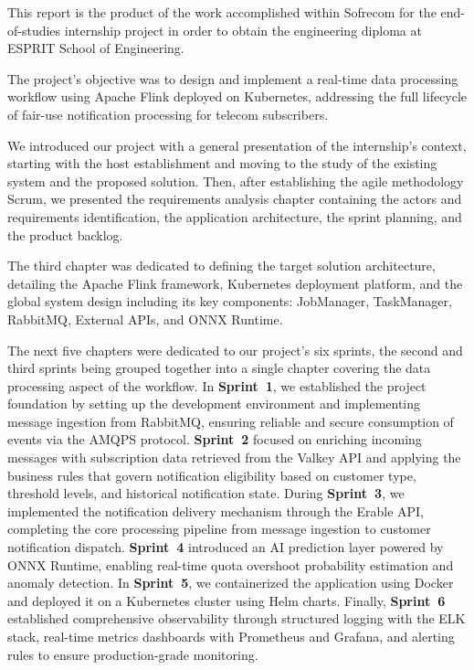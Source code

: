 
This report is the product of the work accomplished within Sofrecom for the end-of-studies internship project in order to obtain the engineering diploma at ESPRIT School of Engineering.

The project's objective was to design and implement a real-time data processing workflow using Apache Flink deployed on Kubernetes, addressing the full lifecycle of fair-use notification processing for telecom subscribers.

We introduced our project with a general presentation of the internship's context, starting with the host establishment and moving to the study of the existing system and the proposed solution. Then, after establishing the agile methodology Scrum, we presented the requirements analysis chapter containing the actors and requirements identification, the application architecture, the sprint planning, and the product backlog.

The third chapter was dedicated to defining the target solution architecture, detailing the Apache Flink framework, Kubernetes deployment platform, and the global system design including its key components: JobManager, TaskManager, RabbitMQ, External APIs, and ONNX Runtime.

The next five chapters were dedicated to our project's six sprints, the second and third sprints being grouped together into a single chapter covering the data processing aspect of the workflow. In \textbf{Sprint~1}, we established the project foundation by setting up the development environment and implementing message ingestion from RabbitMQ, ensuring reliable and secure consumption of events via the AMQPS protocol. \textbf{Sprint~2} focused on enriching incoming messages with subscription data retrieved from the Valkey API and applying the business rules that govern notification eligibility based on customer type, threshold levels, and historical notification state. During \textbf{Sprint~3}, we implemented the notification delivery mechanism through the Erable API, completing the core processing pipeline from message ingestion to customer notification dispatch. \textbf{Sprint~4} introduced an AI prediction layer powered by ONNX Runtime, enabling real-time quota overshoot probability estimation and anomaly detection. In \textbf{Sprint~5}, we containerized the application using Docker and deployed it on a Kubernetes cluster using Helm charts. Finally, \textbf{Sprint~6} established comprehensive observability through structured logging with the ELK stack, real-time metrics dashboards with Prometheus and Grafana, and alerting rules to ensure production-grade monitoring.

